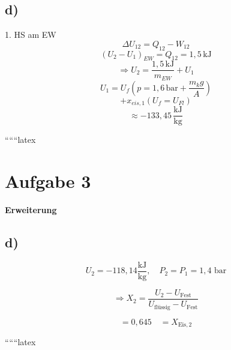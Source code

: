 

\subsection*{d)}
1. HS am EW
\[
\Delta U_{12} = Q_{12} - W_{12}
\]
\[
(U_2 - U_1)_{EW} = Q_{12} = 1,5 \, \text{kJ}
\]
\[
\Rightarrow U_2 = \frac{1,5 \, \text{kJ}}{m_{EW}} + U_1
\]
\[
U_1 = U_f \left( p = 1,6 \, \text{bar} + \frac{m_k g}{A} \right)
\]
\[
+ x_{eis,1} (U_f = U_{Fl})
\]
\[
\approx -133,45 \, \frac{\text{kJ}}{\text{kg}}
\]

``````latex


\section*{Aufgabe 3}
\textbf{Erweiterung}



\subsection*{d)}

\[
U_2 = -118,14 \frac{\text{kJ}}{\text{kg}}, \quad P_2 = P_1 = 1,4 \text{ bar}
\]

\[
\Rightarrow X_2 = \frac{U_2 - U_{\text{Fest}}}{U_{\text{flüssig}} - U_{\text{Fest}}}
\]

\[
= 0,645 \quad = X_{\text{Eis},2}
\]

``````latex